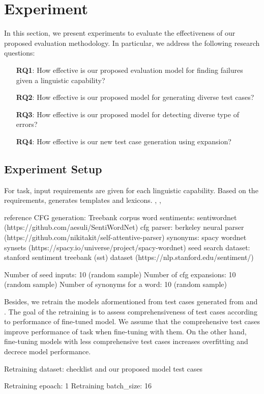\section{Experiment}
\label{sec:experiment}

In this section, we present experiments to
evaluate the effectiveness of our proposed evaluation methodology. In
particular, we address the following research questions:

\begin{enumerate}
\item[\textbf{RQ1}:] How effective is our proposed evaluation model
  for finding failures given a linguistic capability?
\item[\textbf{RQ2}:] How effective is our proposed model for
  generating diverse test cases? %
\item[\textbf{RQ3}:]  How effective is our proposed model for
  detecting diverse type of errors? %
\item[\textbf{RQ4}:] How effective is our new test case generation
  using \cfg expansion? %
    
\end{enumerate}

\subsection{Experiment Setup}

For \sa task, input requirements are given for each linguistic
capability. Based on the requirements, \Model generates templates and
lexicons.
\Bert, \Roberta, \Dbert

reference CFG generation: Treebank corpus
word sentiments: sentiwordnet (https://github.com/aesuli/SentiWordNet)
cfg parser: berkeley neural parser (https://github.com/nikitakit/self-attentive-parser)
synonyms: spacy wordnet synsets (https://spacy.io/universe/project/spacy-wordnet)
seed search dataset: stanford sentiment treebank (sst) dataset (https://nlp.stanford.edu/sentiment/)

Number of seed inputs: 10 (random sample)
Number of cfg expansions: 10 (random sample)
Number of synonyms for a word: 10 (random sample)

Besides, we retrain the \sota \sa models aformentioned from test cases
generated from \Chlst and \Model. The goal of the retraining is to
assess comprehensiveness of test cases according to performance of
fine-tuned model. We assume that the comprehensive test cases improve
performance of \sa task when fine-tuning with them. On the other hand,
fine-tuning models with less comprehensive test cases increases
overfitting and decrece model performance.

Retraining dataset: checklist and our proposed model test cases

Retraining epoach: 1
Retraining batch_size: 16
